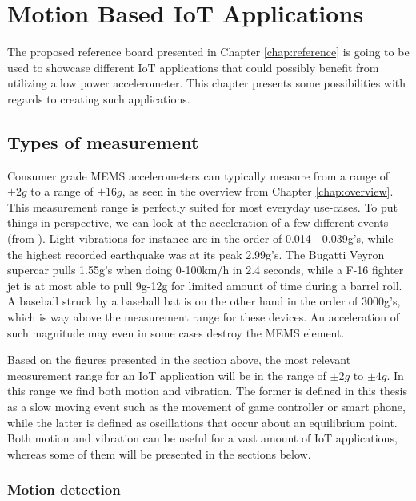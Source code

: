 \chapter{Motion Based IoT Applications}
\label{chap:applications}

The proposed reference board presented in Chapter \ref{chap:reference} is going to be used to showcase different IoT applications that could possibly benefit from utilizing a low power accelerometer. This chapter presents some possibilities with regards to creating such applications. 

\section{Types of measurement}

Consumer grade MEMS accelerometers can typically measure from a range of $\pm2g$ to a range of $\pm16g$, as seen in the overview from Chapter \ref{chap:overview}. This measurement range is perfectly suited for most everyday use-cases. To put things in perspective, we can look at the acceleration of a few different events (from \cite{g-force}). Light vibrations for instance are in the order of 0.014 - 0.039g's, while the highest recorded earthquake was at its peak 2.99g's. The Bugatti Veyron supercar pulls 1.55g's when doing 0-100km/h in 2.4 seconds, while a F-16 fighter jet is at most able to pull 9g-12g for limited amount of time during a barrel roll. A baseball struck by a baseball bat is on the other hand in the order of 3000g's, which is way above the measurement range for these devices. An acceleration of such magnitude may even in some cases destroy the MEMS element. 

Based on the figures presented in the section above, the most relevant measurement range for an IoT application will be in the range of $\pm2g$ to $\pm4g$. In this range we find both motion and vibration. The former is defined in this thesis as a slow moving event such as the movement of game controller or smart phone, while the latter is defined as oscillations that occur about an equilibrium point. Both motion and vibration can be useful for a vast amount of IoT applications, whereas some of them will be presented in the sections below. 

\subsection{Motion detection}

